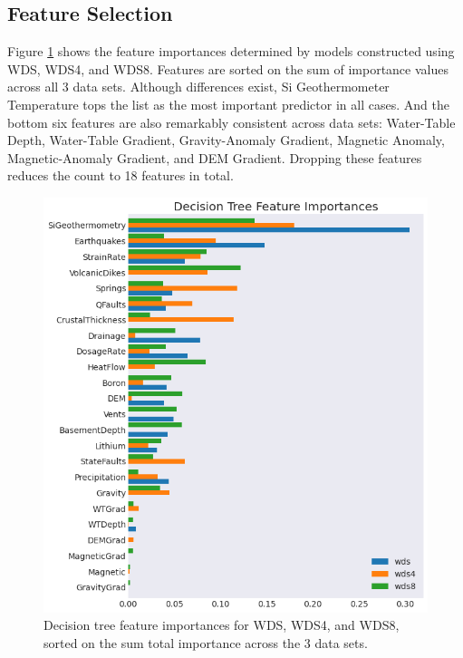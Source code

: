 \subsection{Feature Selection}\label{ch5:dtree_feat_selection}

Figure \ref{fig:dtree_feat_import} shows the feature importances determined by models constructed using WDS, WDS4, and WDS8. Features are sorted on the sum of importance values across all 3 data sets. Although differences exist, Si Geothermometer Temperature tops the list as the most important predictor in all cases. And the bottom six features are also remarkably consistent across data sets: Water-Table Depth, Water-Table Gradient, Gravity-Anomaly Gradient, Magnetic Anomaly, Magnetic-Anomaly Gradient, and DEM Gradient. Dropping these features reduces the count to 18 features in total.

\begin{figure}[!htp]
\centering
\includegraphics[width=\textwidth]{templates/images/Figure-DT_feature_importances_all.png}
\caption[Decision tree feature importances]{Decision tree feature importances for WDS, WDS4, and WDS8, sorted on the sum total importance across the 3 data sets.}
\label{fig:dtree_feat_import}
\end{figure}

